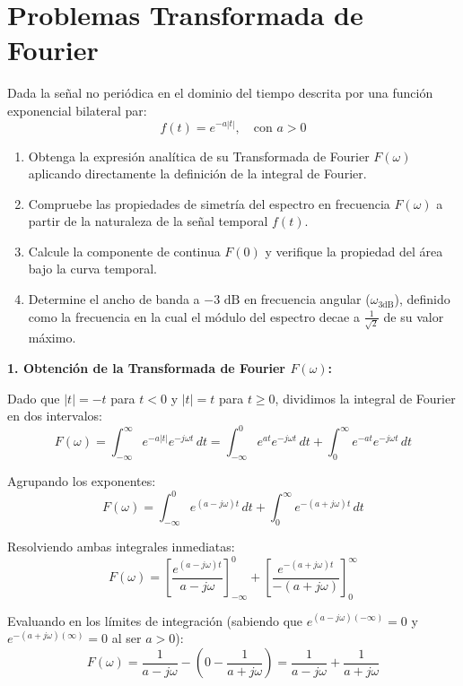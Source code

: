 \section{Problemas Transformada de Fourier}
\setcounter{problemacontador}{0}
\begin{problema}
Dada la señal no periódica en el dominio del tiempo descrita por una función exponencial bilateral par:
\[ f(t) = e^{-a|t|}, \quad \text{con } a > 0 \]

\begin{enumerate}
    \item Obtenga la expresión analítica de su Transformada de Fourier $F(\omega)$ aplicando directamente la definición de la integral de Fourier.
    \item Compruebe las propiedades de simetría del espectro en frecuencia $F(\omega)$ a partir de la naturaleza de la señal temporal $f(t)$.
    \item Calcule la componente de continua $F(0)$ y verifique la propiedad del área bajo la curva temporal.
    \item Determine el ancho de banda a $-3\text{ dB}$ en frecuencia angular ($\omega_{3\text{dB}}$), definido como la frecuencia en la cual el módulo del espectro decae a $\frac{1}{\sqrt{2}}$ de su valor máximo.
\end{enumerate}

\tcblower

\textbf{1. Obtención de la Transformada de Fourier $F(\omega)$:}

Dado que $|t| = -t$ para $t < 0$ y $|t| = t$ para $t \ge 0$, dividimos la integral de Fourier en dos intervalos:
\[ F(\omega) = \int_{-\infty}^{\infty} e^{-a|t|} e^{-j\omega t} \, dt = \int_{-\infty}^{0} e^{at} e^{-j\omega t} \, dt + \int_{0}^{\infty} e^{-at} e^{-j\omega t} \, dt \]

Agrupando los exponentes:
\[ F(\omega) = \int_{-\infty}^{0} e^{(a - j\omega)t} \, dt + \int_{0}^{\infty} e^{-(a + j\omega)t} \, dt \]

Resolviendo ambas integrales inmediatas:
\[ F(\omega) = \left[ \frac{e^{(a - j\omega)t}}{a - j\omega} \right]_{-\infty}^{0} + \left[ \frac{e^{-(a + j\omega)t}}{-(a + j\omega)} \right]_{0}^{\infty} \]

Evaluando en los límites de integración (sabiendo que $e^{(a - j\omega)(-\infty)} = 0$ y $e^{-(a + j\omega)(\infty)} = 0$ al ser $a > 0$):
\[ F(\omega) = \frac{1}{a - j\omega} - \left( 0 - \frac{1}{a + j\omega} \right) = \frac{1}{a - j\omega} + \frac{1}{a + j\omega} \]


\end{problema}
